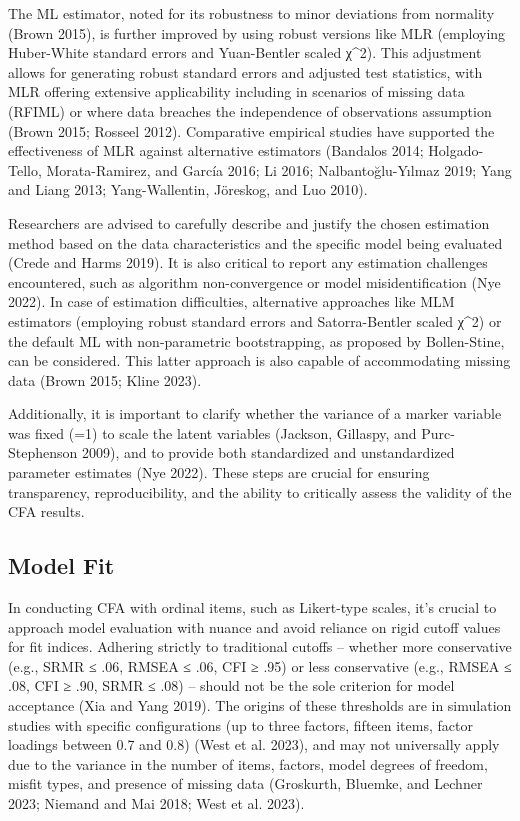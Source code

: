 \documentclass[
  a4paper,
]{article}
\begin{document}
The ML estimator, noted for its robustness to minor deviations from
normality (Brown 2015), is further improved by using robust versions
like MLR (employing Huber-White standard errors and Yuan-Bentler scaled
χ\^{}2). This adjustment allows for generating robust standard errors
and adjusted test statistics, with MLR offering extensive applicability
including in scenarios of missing data (RFIML) or where data breaches
the independence of observations assumption (Brown 2015; Rosseel 2012).
Comparative empirical studies have supported the effectiveness of MLR
against alternative estimators (Bandalos 2014; Holgado-Tello,
Morata-Ramirez, and García 2016; Li 2016; Nalbantoğlu-Yılmaz 2019; Yang
and Liang 2013; Yang-Wallentin, Jöreskog, and Luo 2010).

Researchers are advised to carefully describe and justify the chosen
estimation method based on the data characteristics and the specific
model being evaluated (Crede and Harms 2019). It is also critical to
report any estimation challenges encountered, such as algorithm
non-convergence or model misidentification (Nye 2022). In case of
estimation difficulties, alternative approaches like MLM estimators
(employing robust standard errors and Satorra-Bentler scaled χ\^{}2) or
the default ML with non-parametric bootstrapping, as proposed by
Bollen-Stine, can be considered. This latter approach is also capable of
accommodating missing data (Brown 2015; Kline 2023).

Additionally, it is important to clarify whether the variance of a
marker variable was fixed (=1) to scale the latent variables (Jackson,
Gillaspy, and Purc-Stephenson 2009), and to provide both standardized
and unstandardized parameter estimates (Nye 2022). These steps are
crucial for ensuring transparency, reproducibility, and the ability to
critically assess the validity of the CFA results.

\subsection{Model Fit}\label{model-fit}

In conducting CFA with ordinal items, such as Likert-type scales, it's
crucial to approach model evaluation with nuance and avoid reliance on
rigid cutoff values for fit indices. Adhering strictly to traditional
cutoffs -- whether more conservative (e.g., SRMR ≤ .06, RMSEA ≤ .06, CFI
≥ .95) or less conservative (e.g., RMSEA ≤ .08, CFI ≥ .90, SRMR ≤ .08)
-- should not be the sole criterion for model acceptance (Xia and Yang
2019). The origins of these thresholds are in simulation studies with
specific configurations (up to three factors, fifteen items, factor
loadings between 0.7 and 0.8) (West et al. 2023), and may not
universally apply due to the variance in the number of items, factors,
model degrees of freedom, misfit types, and presence of missing data
(Groskurth, Bluemke, and Lechner 2023; Niemand and Mai 2018; West et al.
2023).
\end{document}

